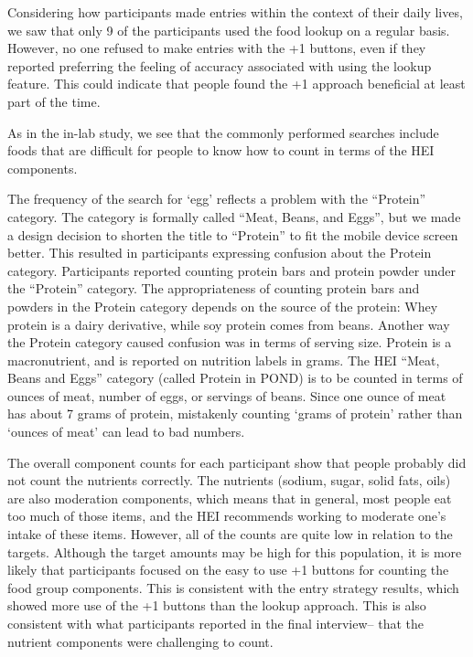 Considering how participants made entries within the context of their daily lives, we saw that only 9 of the participants used the food lookup on a regular basis. However, no one refused to make entries with the +1 buttons, even if they reported preferring the feeling of accuracy associated with using the lookup feature. This could indicate that people found the +1 approach beneficial at least part of the time. 

As in the in-lab study, we see that the commonly performed searches include foods that are difficult for people to know how to count in terms of the HEI components. 

The frequency of the search for `egg' reflects a problem with the ``Protein'' category. The category is formally called ``Meat, Beans, and Eggs'', but we made a design decision to shorten the title to ``Protein'' to fit the mobile device screen better. This resulted in participants expressing confusion about the Protein category. Participants reported counting protein bars and protein powder under the ``Protein'' category. The appropriateness of counting protein bars and powders in the Protein category depends on the source of the protein: Whey protein is a dairy derivative, while soy protein comes from beans. Another way the Protein category caused confusion was in terms of serving size. Protein is a macronutrient, and is reported on nutrition labels in grams. The HEI ``Meat, Beans and Eggs'' category (called Protein in POND) is to be counted in terms of ounces of meat, number of eggs, or servings of beans. Since one ounce of meat has about 7 grams of protein, mistakenly counting `grams of protein' rather than `ounces of meat' can lead to bad numbers. 

The overall component counts for each participant show that people probably did not count the nutrients correctly. The nutrients (sodium, sugar, solid fats, oils) are also moderation components, which means that in general, most people eat too much of those items, and the HEI recommends working to moderate one's intake of these items. However, all of the counts are quite low in relation to the targets. Although the target amounts may be high for this population, it is more likely that participants focused on the easy to use +1 buttons for counting the food group components. This is consistent with the entry strategy results, which showed more use of the +1 buttons than the lookup approach. This is also consistent with what participants reported in the final interview-- that the nutrient components were challenging to count. 

